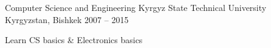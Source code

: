 \begin{cventries}
  \cventry
    {Computer Science and Engineering}
    {Kyrgyz State Technical University}
    {Kyrgyzstan, Bishkek}
    {2007 – 2015}
    {
      \begin{cvitems}
        \item {Learn CS basics \& Electronics basics}
      \end{cvitems}
    }
\end{cventries}
